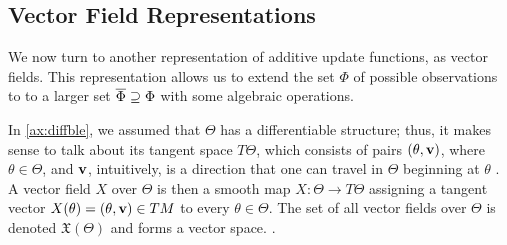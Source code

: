 

% 


\subsection{Vector Field Representations}
\label{sec:vecrep}

We now turn to another representation of additive 
update functions, as vector fields. 
This representation allows us to extend the set $\Phi$ of possible observations to 
to a larger set $\overline \Phi \supseteq \Phi$ with some algebraic operations.  

In \cref{ax:diffble}, we assumed that $\Theta$ has a differentiable 
structure; thus, it makes sense to talk about its tangent space
$T\Theta$, which consists of pairs $(\theta, \mathbf{v})$, where
$\theta \in \Theta$, and $\mathbf{v}$,
intuitively, is a direction that one can travel in $\Theta$ beginning at $\theta$
\parencite[\S3]{lee2013smooth}.
%
%
A vector field $X$ over $\Theta$ is then
a smooth map $X : \Theta \to T \Theta$ 
assigning a tangent vector $X(\theta) = (\theta, \mathbf{v}) \in TM$ 
to every $\theta \in \Theta$.
The set of all vector fields over $\Theta$ is denoted $\mathfrak X(\Theta)$
 and forms a vector space.
\parencite[\S8]{lee2013smooth}
\unskip.

